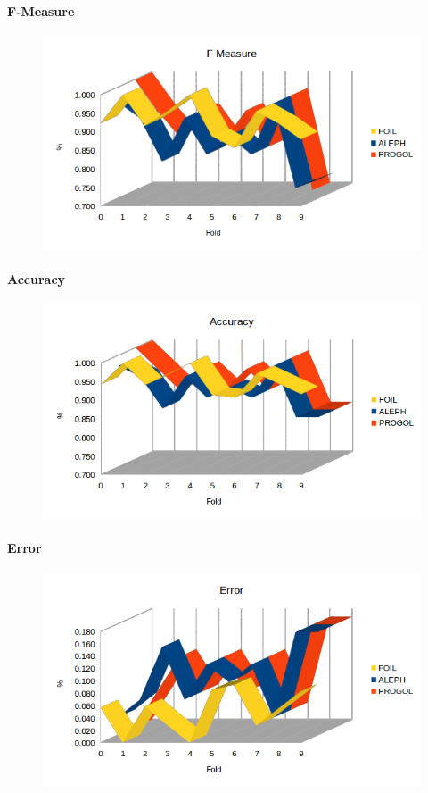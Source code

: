 \paragraph{F-Measure}
\begin{figure}[hbtp]
	\includegraphics[width=1.2\textwidth]{img/datasetGraph/mlj/discr/fm.png}
	\label{mljdiscr-F-measure}
\end{figure}
\paragraph{Accuracy}
\begin{figure}[hbtp]
	\includegraphics[width=1.2\textwidth]{img/datasetGraph/mlj/discr/accuracy.png}
	\label{mljdiscr-Accuracy}
\end{figure}
\paragraph{Error}
\begin{figure}[hbtp]
	\includegraphics[width=1.2\textwidth]{img/datasetGraph/mlj/discr/error.png}
	\label{mljdiscr-Error}
\end{figure}

